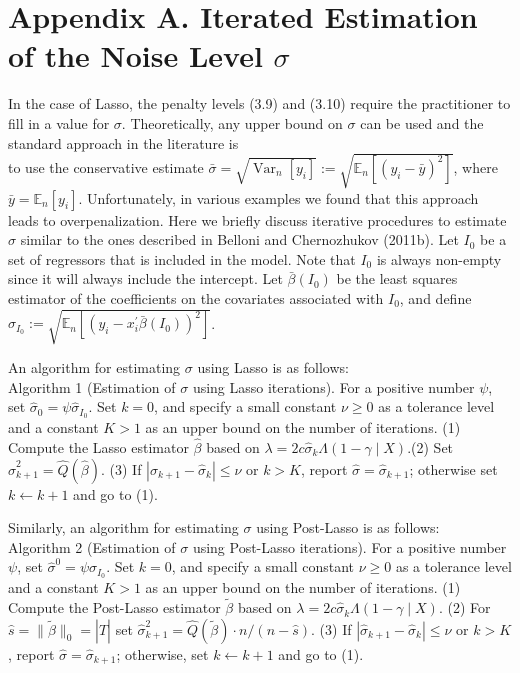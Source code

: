 \documentclass[10pt]{article}
\begin{document}
\section*{Appendix A. Iterated Estimation of the Noise Level \(\sigma\)}
In the case of Lasso, the penalty levels (3.9) and (3.10) require the practitioner to fill in a value for \(\sigma\). Theoretically, any upper bound on \(\sigma\) can be used and the standard approach in the literature is\\
to use the conservative estimate \(\bar{\sigma}=\sqrt{\operatorname{Var}_{n}\left[y_{i}\right]}:=\sqrt{\mathbb{E}_{n}\left[\left(y_{i}-\bar{y}\right)^{2}\right]}\), where \(\bar{y}=\mathbb{E}_{n}\left[y_{i}\right]\). Unfortunately, in various examples we found that this approach leads to overpenalization. Here we briefly discuss iterative procedures to estimate \(\sigma\) similar to the ones described in Belloni and Chernozhukov (2011b). Let \(I_{0}\) be a set of regressors that is included in the model. Note that \(I_{0}\) is always non-empty since it will always include the intercept. Let \(\bar{\beta}\left(I_{0}\right)\) be the least squares estimator of the coefficients on the covariates associated with \(I_{0}\), and define \(\widehat{\sigma}_{I_{0}}:=\sqrt{\mathbb{E}_{n}\left[\left(y_{i}-x_{i}^{\prime} \bar{\beta}\left(I_{0}\right)\right)^{2}\right]}\).

An algorithm for estimating \(\sigma\) using Lasso is as follows:\\
Algorithm 1 (Estimation of \(\sigma\) using Lasso iterations). For a positive number \(\psi\), set \(\widehat{\sigma}_{0}=\psi \widehat{\sigma}_{I_{0}}\). Set \(k=0\), and specify a small constant \(\nu \geqslant 0\) as a tolerance level and a constant \(K>1\) as an upper bound on the number of iterations. (1) Compute the Lasso estimator \(\widehat{\beta}\) based on \(\lambda=2 c \widehat{\sigma}_{k} \Lambda(1-\gamma \mid X)\).(2) Set \(\widehat{\sigma}_{k+1}^{2}=\widehat{Q}(\widehat{\beta})\). (3) If \(\left|\widehat{\sigma}_{k+1}-\widehat{\sigma}_{k}\right| \leqslant \nu\) or \(k>K\), report \(\widehat{\sigma}=\widehat{\sigma}_{k+1}\); otherwise set \(k \leftarrow k+1\) and go to (1).

Similarly, an algorithm for estimating \(\sigma\) using Post-Lasso is as follows:\\
Algorithm 2 (Estimation of \(\sigma\) using Post-Lasso iterations). For a positive number \(\psi\), set \(\widehat{\sigma}^{0}=\psi \widehat{\sigma}_{I_{0}}\). Set \(k=0\), and specify a small constant \(\nu \geqslant 0\) as a tolerance level and a constant \(K>1\) as an upper bound on the number of iterations. (1) Compute the Post-Lasso estimator \(\widetilde{\beta}\) based on \(\lambda=2 c \widehat{\sigma}_{k} \Lambda(1-\gamma \mid X)\). (2) For \(\widehat{s}=\|\widetilde{\beta}\|_{0}=|\widehat{T}|\) set \(\widehat{\sigma}_{k+1}^{2}=\widehat{Q}(\widetilde{\beta}) \cdot n /(n-\widehat{s})\). (3) If \(\left|\widehat{\sigma}_{k+1}-\widehat{\sigma}_{k}\right| \leqslant \nu\) or \(k>K\), report \(\widehat{\sigma}=\widehat{\sigma}_{k+1}\); otherwise, set \(k \leftarrow k+1\) and go to (1).
\end{document}
